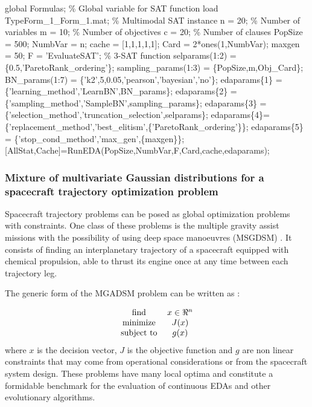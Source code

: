 \documentclass[a4paper]{article}
\begin{document}
\begin{example}
\begin{programf}
 global Formulas;   \% Global variable for SAT function
 load TypeForm\_1\_Form\_1.mat; \% Multimodal SAT instance
 n = 20;  \% Number of variables
 m = 10;  \% Number of objectives
 c = 20;  \% Number of clauses
 PopSize = 500;
 NumbVar = n;
 cache  = [1,1,1,1,1];
 Card = 2*ones(1,NumbVar);
 maxgen = 50;
 F = 'EvaluateSAT'; \% 3-SAT function
 selparams(1:2) = \{0.5,'ParetoRank\_ordering'\};
 sampling\_params(1:3) = \{PopSize,m,Obj\_Card\};
 BN\_params(1:7) = \{'k2',5,0.05,'pearson','bayesian','no'\};
 edaparams\{1\} = \{'learning\_method','LearnBN',BN\_params\};
 edaparams\{2\} = \{'sampling\_method','SampleBN',sampling\_params\};
 edaparams\{3\} = \{'selection\_method','truncation\_selection',selparams\};
 edaparams\{4\}=\{'replacement\_method','best\_elitism',\{'ParetoRank\_ordering'\}\};
 edaparams\{5\} = \{'stop\_cond\_method','max\_gen',\{maxgen\}\};
 [AllStat,Cache]=RunEDA(PopSize,NumbVar,F,Card,cache,edaparams); \end{programf}
\label{ex:SATEDA} \end{example}



\subsubsection{Mixture of multivariate Gaussian distributions for a spacecraft trajectory optimization problem}

Spacecraft trajectory problems can be posed as global optimization problems with constraints.
One class of these problems is the multiple gravity assist missions with the possibility of using
deep space manoeuvres (MSGDSM) \cite{Vinko_et_al:2007}. It consists of finding an interplanetary
trajectory of a spacecraft equipped with chemical
propulsion, able to thrust its engine once at any time between each
trajectory leg.

The generic form of the MGADSM
problem can be written as \cite{Vinko_et_al:2007}:

\begin{equation}
\begin{tabular}{cc}
find & $x \in \Re^n$  \\
minimize & $J(x)$ \\
subject to & $g(x)$ \\
\end{tabular}  \nonumber
\end{equation}
where $x$ is the decision vector, $J$ is the objective function and $g$ are non linear
constraints that may come from operational considerations or from the spacecraft system
design. These problems have many local optima and
 constitute a formidable benchmark for the evaluation of
continuous EDAs and other evolutionary algorithms.
\end{document}
